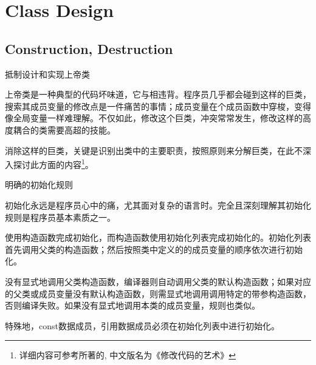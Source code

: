 \begin{savequote}[45mm]
\end{savequote}

\chapter{Class Design}
\label{ch:class-design}

\section{Construction, Destruction}

\begin{content}

\begin{regulation}
抵制设计和实现上帝类
\end{regulation}

上帝类是一种典型的代码坏味道，它与相违背。程序员几乎都会碰到这样的巨类，搜索其成员变量的修改点是一件痛苦的事情；成员变量在个成员函数中穿梭，变得像全局变量一样难理解。不仅如此，修改这个巨类，冲突常常发生，修改这样的高度耦合的类需要高超的技能。

消除这样的巨类，关键是识别出类中的主要职责，按照原则来分解巨类，在此不深入探讨此方面的内容\footnote{详细内容可参考所著的, 中文版名为《修改代码的艺术》}。

\begin{regulation}
明确的初始化规则
\end{regulation}

初始化永远是程序员心中的痛，尤其面对复杂的语言时。完全且深刻理解其初始化规则是程序员基本素质之一。

使用构造函数完成初始化，而构造函数使用初始化列表完成初始化的。初始化列表首先调用父类的构造函数；然后按照类中定义的的成员变量的顺序依次进行初始化。

没有显式地调用父类构造函数，编译器则自动调用父类的默认构造函数；如果对应的父类或成员变量没有默认构造函数，则需显式地调用调用特定的带参构造函数，否则编译失败。如果没有显式地调用本类的成员变量，规则也类似。

特殊地，const数据成员，引用数据成员必须在初始化列表中进行初始化。


\end{content}
